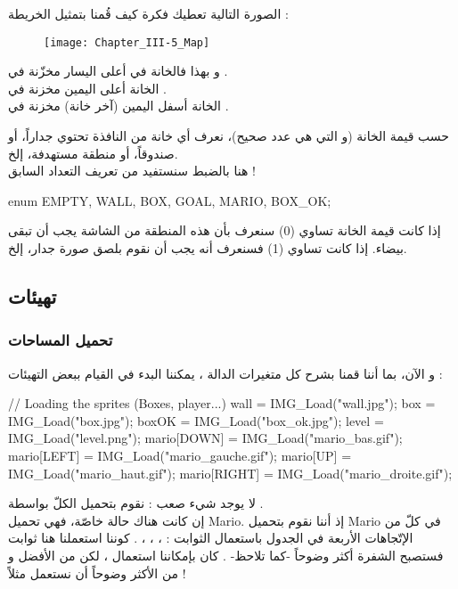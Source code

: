 الصورة التالية تعطيك فكرة كيف قُمنا بتمثيل الخريطة  :

\begin{figure}[H]
	\centering
	\texttt{[image: Chapter\_III-5\_Map]}
\end{figure}

و بهذا فالخانة في أعلى اليسار مخزّنة في
.\\
الخانة أعلى اليمين مخزنة في
.\\
الخانة أسفل اليمين (آخر خانة) مخزنة في
.

حسب قيمة الخانة (و التي هي عدد صحيح)، نعرف أي خانة من النافذة تحتوي جداراً، أو صندوقاً، أو منطقة مستهدفة، إلخ.\\
هنا بالضبط سنستفيد من تعريف التعداد السابق !

\begin{Csource}
enum {EMPTY, WALL, BOX, GOAL, MARIO, BOX_OK};
\end{Csource}

إذا كانت قيمة الخانة تساوي
 (0)
سنعرف بأن هذه المنطقة من الشاشة يجب أن تبقى بيضاء. إذا كانت تساوي
 (1)
فسنعرف أنه يجب أن نقوم بلصق صورة جدار، إلخ.

\subsection{تهيئات}

\subsubsection{تحميل المساحات}

و الآن، بما أننا قمنا بشرح كل متغيرات الدالة
،
يمكننا البدء في القيام ببعض التهيئات :

\begin{Csource}
// Loading the sprites (Boxes, player...)
wall = IMG_Load("wall.jpg");
box = IMG_Load("box.jpg");
boxOK = IMG_Load("box_ok.jpg");
level = IMG_Load("level.png");
mario[DOWN] = IMG_Load("mario_bas.gif");
mario[LEFT] = IMG_Load("mario_gauche.gif");
mario[UP] = IMG_Load("mario_haut.gif");
mario[RIGHT] = IMG_Load("mario_droite.gif");
\end{Csource}

لا يوجد شيء صعب : نقوم بتحميل الكلّ بواسطة 
.\\
إن كانت هناك حالة خاصّة، فهي تحميل
\textenglish{Mario}.
 إذ أننا نقوم بتحميل 
\textenglish{Mario}
 في كلّ من الإتّجاهات الأربعة في الجدول
باستعمال الثوابت : 
، ، ، .
كوننا استعملنا هنا ثوابت فستصبح الشفرة أكثر وضوحاً -كما تلاحظ- . كان بإمكاننا استعمال
،
لكن من الأفضل و من الأكثر وضوحاً أن نستعمل
مثلاً !

